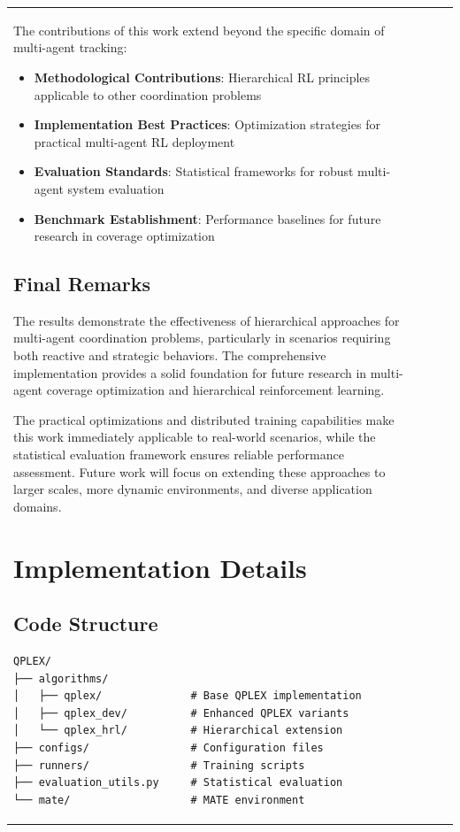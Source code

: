 \documentclass[12pt,a4paper]{report}
\begin{document}
\begin{table}[H]
\begin{table}[H]
\begin{tabular}{lccc}
\begin{table}[H]
\begin{table}[H]
The contributions of this work extend beyond the specific domain of multi-agent tracking:

\begin{itemize}
\item \textbf{Methodological Contributions}: Hierarchical RL principles applicable to other coordination problems
\item \textbf{Implementation Best Practices}: Optimization strategies for practical multi-agent RL deployment
\item \textbf{Evaluation Standards}: Statistical frameworks for robust multi-agent system evaluation
\item \textbf{Benchmark Establishment}: Performance baselines for future research in coverage optimization
\end{itemize}

\section{Final Remarks}

The results demonstrate the effectiveness of hierarchical approaches for multi-agent coordination problems, particularly in scenarios requiring both reactive and strategic behaviors. The comprehensive implementation provides a solid foundation for future research in multi-agent coverage optimization and hierarchical reinforcement learning.

The practical optimizations and distributed training capabilities make this work immediately applicable to real-world scenarios, while the statistical evaluation framework ensures reliable performance assessment. Future work will focus on extending these approaches to larger scales, more dynamic environments, and diverse application domains.

\appendix

\chapter{Implementation Details}

\section{Code Structure}
\begin{lstlisting}
QPLEX/
├── algorithms/
│   ├── qplex/              # Base QPLEX implementation
│   ├── qplex_dev/          # Enhanced QPLEX variants
│   └── qplex_hrl/          # Hierarchical extension
├── configs/                # Configuration files
├── runners/                # Training scripts
├── evaluation_utils.py     # Statistical evaluation
└── mate/                   # MATE environment
\end{lstlisting}


\end{table}
\end{table}
\end{tabular}
\end{table}
\end{table}
\end{document}
